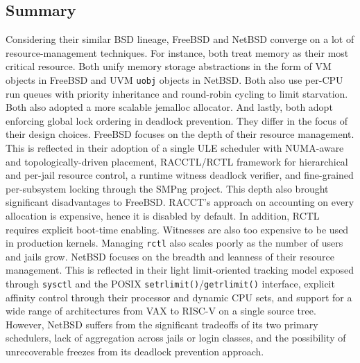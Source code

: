 \subsection{Summary} \label{resource-summary}

Considering their similar BSD lineage, FreeBSD and NetBSD converge on a lot of resource-management techniques. For
instance, both treat memory as their most critical resource. Both unify memory storage abstractions in the form of VM objects
in FreeBSD and UVM \texttt{uobj} objects in NetBSD. Both also use per-CPU run queues with priority inheritance and
round-robin cycling to limit starvation. Both also adopted a more scalable jemalloc allocator. And lastly, both
adopt enforcing global lock ordering in deadlock prevention. They differ in the focus of their design choices. FreeBSD
focuses on the depth of their resource management. This is reflected in their adoption of a single ULE scheduler
with NUMA-aware and topologically-driven placement, RACCTL/RCTL framework for hierarchical and per-jail resource
control, a runtime witness deadlock verifier, and fine-grained per-subsystem locking through the SMPng project.
This depth also brought significant disadvantages to FreeBSD. RACCT's approach on accounting on every allocation is expensive,
hence it is disabled by default. In addition, RCTL requires explicit boot-time enabling. Witnesses are also too
expensive to be used in production kernels. Managing \texttt{rctl} also scales poorly as the number of users and jails
grow. NetBSD focuses on the breadth and leanness of their resource management. This is reflected in their light
limit-oriented tracking model exposed through \texttt{sysctl} and the POSIX \texttt{setrlimit()}/\texttt{getrlimit()}
interface, explicit affinity control through their processor and dynamic CPU sets, and support for a wide range
of architectures from VAX to RISC-V on a single source tree. However, NetBSD suffers from the significant tradeoffs
of its two primary schedulers, lack of aggregation across jails or login classes, and the possibility of unrecoverable
freezes from its deadlock prevention approach.

